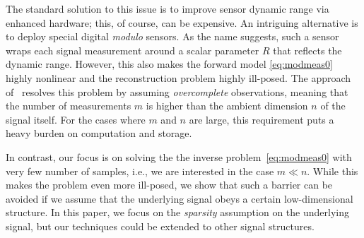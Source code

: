 The standard solution to this issue is to improve sensor dynamic range via enhanced hardware; this, of course, can be expensive. An intriguing alternative is to deploy special digital \emph{modulo} sensors. As the name suggests, such a sensor wraps each signal measurement around a scalar parameter $R$ that reflects the dynamic range. However, this also makes the forward model \eqref{eq:modmeas0} highly nonlinear and the reconstruction problem highly ill-posed. The approach of~\cite{Bhandari,Zhao15} resolves this problem by assuming \emph{overcomplete} observations, meaning that the number of measurements $m$ is higher than the ambient dimension $n$ of the signal itself. For the cases where $m$ and $n$ are large, this requirement puts a heavy burden on computation and storage. 

In contrast, our focus is on solving the the inverse problem~\eqref{eq:modmeas0} with very few number of samples, {i.e.}, we are interested in the case $m \ll n$. While this makes the problem even more ill-posed, we show that such a barrier can be avoided if we assume that the underlying signal obeys a certain low-dimensional structure. In this paper, we focus on the \emph{sparsity} assumption on the underlying signal, but our techniques could be extended to other signal structures.  


